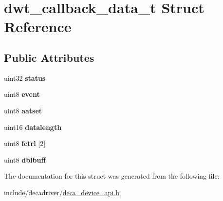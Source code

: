 \hypertarget{structdwt__callback__data__t}{\section{dwt\-\_\-callback\-\_\-data\-\_\-t Struct Reference}
\label{structdwt__callback__data__t}
}
\subsection*{Public Attributes}
\begin{DoxyCompactItemize}
\item 
\hypertarget{structdwt__callback__data__t_ae34adbe8194218241f097f2d49961f13}{uint32 {\bfseries status}}\label{structdwt__callback__data__t_ae34adbe8194218241f097f2d49961f13}

\item 
\hypertarget{structdwt__callback__data__t_a938efc8041a462e095ca45bb374e8371}{uint8 {\bfseries event}}\label{structdwt__callback__data__t_a938efc8041a462e095ca45bb374e8371}

\item 
\hypertarget{structdwt__callback__data__t_a04227c096139b7e8f39a9f5e161312ff}{uint8 {\bfseries aatset}}\label{structdwt__callback__data__t_a04227c096139b7e8f39a9f5e161312ff}

\item 
\hypertarget{structdwt__callback__data__t_a8ee01a3e0c334232db4b770bda394952}{uint16 {\bfseries datalength}}\label{structdwt__callback__data__t_a8ee01a3e0c334232db4b770bda394952}

\item 
\hypertarget{structdwt__callback__data__t_ae8a3aa12466432cc14878ba01f1ec342}{uint8 {\bfseries fctrl} \mbox{[}2\mbox{]}}\label{structdwt__callback__data__t_ae8a3aa12466432cc14878ba01f1ec342}

\item 
\hypertarget{structdwt__callback__data__t_a4886b592a08279fcbb4cf11dbc9bf4ef}{uint8 {\bfseries dblbuff}}\label{structdwt__callback__data__t_a4886b592a08279fcbb4cf11dbc9bf4ef}

\end{DoxyCompactItemize}


The documentation for this struct was generated from the following file\-:\begin{DoxyCompactItemize}
\item 
include/decadriver/\hyperlink{deca__device__api_8h}{deca\-\_\-device\-\_\-api.\-h}\end{DoxyCompactItemize}
